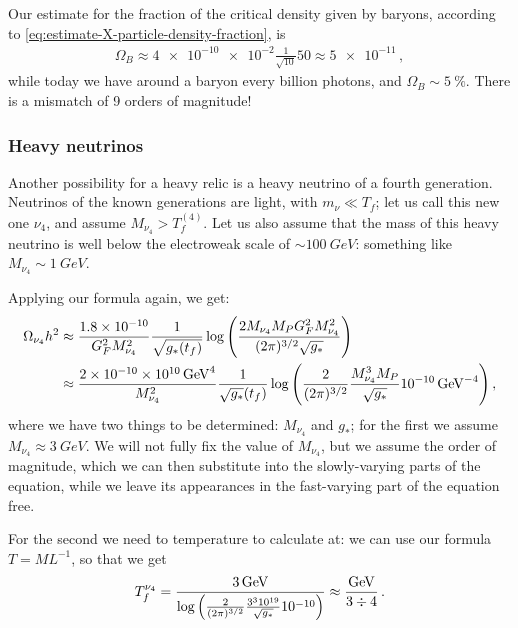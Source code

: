 \documentclass[main.tex]{subfiles}
\begin{document}
Our estimate for the fraction of the critical density given by baryons, according to \eqref{eq:estimate-X-particle-density-fraction}, is
%
\begin{align}
\Omega_{B} \approx \num{4e-10} \num{e-2} \frac{1}{\sqrt{10}} 50 \approx \num{5e-11}
\,,
\end{align}
%
while today we have around a baryon every billion photons, and \(\Omega_{B} \sim \SI{5}{\percent}\). 
There is a mismatch of 9 orders of magnitude!


\subsubsection{Heavy neutrinos}

Another possibility for a heavy relic is a heavy neutrino of a fourth generation.   
Neutrinos of the known generations are light, with \(m_\nu \ll T_f\); let us call this new one \(\nu_4 \), and assume \(M_{\nu_4 }> T_f^{(4)}\). 
Let us also assume that the mass of this heavy neutrino is well below the electroweak scale of \(\sim \SI{100}{GeV}\): something like \(M_{\nu_4 } \sim \SI{1}{GeV}\). 

Applying our formula again, we get: 
%
\begin{align}
\Omega_{\nu_4 } h^2 &\approx \frac{\num{1.8e-10}}{G_F^2M^2_{\nu_4 }}
\frac{1}{\sqrt{g_*(t_f)}} 
\log \qty(\frac{2 M_{\nu_4} M_P G_F^2 M^2_{\nu_4 }}{(2 \pi )^{3/2} \sqrt{g_*}})  \\
&\approx 
\frac{\num{2e-10} \times \SI{e10}{GeV^{4}}}{M^2_{\nu_4 }}
\frac{1}{\sqrt{g_*} (t_f)}
\log \qty(
    \frac{2}{(2 \pi )^{3/2}}
    \frac{M^3_{\nu_4 } M_P}{\sqrt{g_*}}
    \SI{e-10}{GeV^{-4}}
)
\,,
\end{align}
%
where we have two things to be determined: \(M_{\nu_4 }\) and \(g_*\); for the first we assume \(M_{\nu_4 } \approx \SI{3}{GeV}\).
We will not fully fix the  value of \(M_{\nu_4 }\), but we assume the order of magnitude, which we can then substitute into the slowly-varying parts of the equation, while we leave its appearances in the fast-varying part of the equation free.

For the second we need to temperature to calculate at: we can use our formula \(T = M L^{-1}\), so that we get 
%
\begin{align}
T_f^{\nu_4 } = \frac{\SI{3}{GeV}}{\log \qty(
    \frac{2}{(2 \pi )^{3/2}}
    \frac{3^{3} \num{e19}}{\sqrt{g_*}}
    \num{e-10}
)}
\approx \frac{\SI{}{GeV}}{3 \divisionsymbol 4}
\,.
\end{align}
\end{document}
